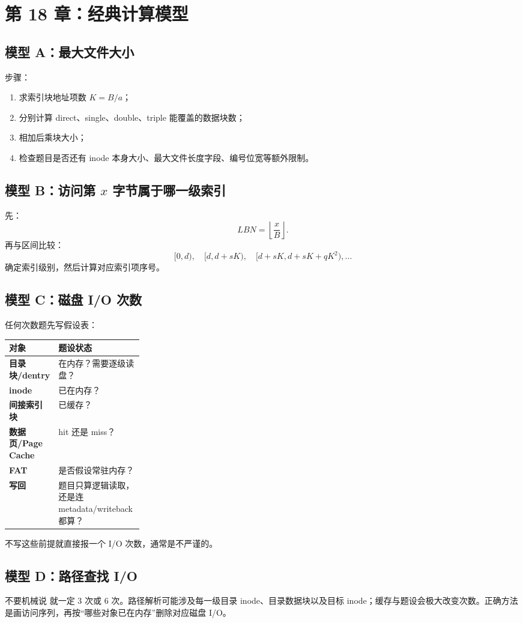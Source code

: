 \documentclass[11pt,a4paper]{ctexart}
\newcommand{\code}[1]{\texttt{\detokenize{#1}}}
\begin{document}
\section{第 18 章：经典计算模型}

\subsection{模型 A：最大文件大小}
步骤：
\begin{enumerate}
  \item 求索引块地址项数 $K=B/a$；
  \item 分别计算 direct、single、double、triple 能覆盖的数据块数；
  \item 相加后乘块大小；
  \item 检查题目是否还有 inode 本身大小、最大文件长度字段、编号位宽等额外限制。
\end{enumerate}

\subsection{模型 B：访问第 $x$ 字节属于哪一级索引}
先：
\[
LBN=\left\lfloor\frac{x}{B}\right\rfloor.
\]
再与区间比较：
\[
[0,d),\quad[d,d+sK),\quad[d+sK,d+sK+qK^2),\ldots
\]
确定索引级别，然后计算对应索引项序号。

\subsection{模型 C：磁盘 I/O 次数}
任何次数题先写假设表：
\begin{center}
\small
\begin{tabularx}{\linewidth}{>{\bfseries}p{0.26\linewidth} X}
\toprule
对象 & 题设状态 \\
\midrule
目录块/dentry & 在内存？需要逐级读盘？ \\
inode & 已在内存？ \\
间接索引块 & 已缓存？ \\
数据页/Page Cache & hit 还是 miss？ \\
FAT & 是否假设常驻内存？ \\
写回 & 题目只算逻辑读取，还是连 metadata/writeback 都算？ \\
\bottomrule
\end{tabularx}
\end{center}
不写这些前提就直接报一个 I/O 次数，通常是不严谨的。

\subsection{模型 D：路径查找 I/O}
不要机械说 \code{/a/b/c} 就一定 3 次或 6 次。路径解析可能涉及每一级目录 inode、目录数据块以及目标 inode；缓存与题设会极大改变次数。正确方法是画访问序列，再按“哪些对象已在内存”删除对应磁盘 I/O。
\end{document}
